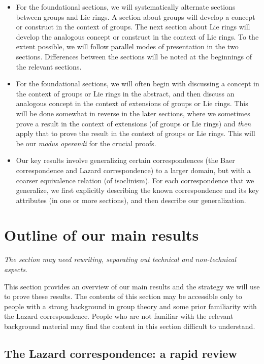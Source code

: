 \documentclass{ucetd}
\begin{document}
\begin{itemize}
\item For the foundational sections, we will systematically alternate
  sections between groups and Lie rings. A section about groups will
  develop a concept or construct in the context of groups. The next
  section about Lie rings will develop the analogous concept or
  construct in the context of Lie rings. To the extent possible, we
  will follow parallel modes of presentation in the two
  sections. Differences between the sections will be noted at the
  beginnings of the relevant sections.
\item For the foundational sections, we will often begin with
  discussing a concept in the context of groups or Lie rings in the
  abstract, and then discuss an analogous concept in the context of
  extensions of groups or Lie rings. This will be done somewhat in
  reverse in the later sections, where we sometimes prove a result in
  the context of extensions (of groups or Lie rings) and {\em then}
  apply that to prove the result in the context of groups or Lie
  rings. This will be our {\em modus operandi} for the crucial proofs.
\item Our key results involve generalizing certain correspondences
  (the Baer correspondence and Lazard correspondence) to a larger
  domain, but with a coarser equivalence relation (of isoclinism). For
  each correspondence that we generalize, we first explicitly
  describing the known correspondence and its key attributes (in one
  or more sections), and then describe our generalization.
\end{itemize}

\section{Outline of our main results}

{\em The section may need rewriting, separating out technical and
  non-technical aspects}.

This section provides an overview of our main results and the strategy
we will use to prove these results. The contents of this section may
be accessible only to people with a strong background in group theory
and some prior familiarity with the Lazard correspondence. People who
are not familiar with the relevant background material may find the
content in this section difficult to understand. 

\subsection{The Lazard correspondence: a rapid review}
\end{document}
